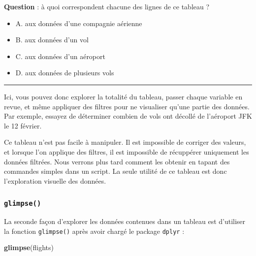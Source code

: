 \documentclass[
  a4paper,
]{article}
\newenvironment{Shaded}{\begin{snugshade}}{\end{snugshade}}
\newcommand{\KeywordTok}[1]{\textcolor[rgb]{0.12,0.11,0.11}{\textbf{#1}}}
\newcommand{\NormalTok}[1]{\textcolor[rgb]{0.12,0.11,0.11}{#1}}
\providecommand{\tightlist}{%
  \setlength{\itemsep}{0pt}\setlength{\parskip}{0pt}}
\begin{document}
\textbf{Question } : à quoi correspondent chacune des lignes de ce tableau ?

\begin{itemize}
\tightlist
\item
  A. aux données d'une compagnie aérienne
\item
  B. aux données d'un vol
\item
  C. aux données d'un aéroport
\item
  D. aux données de plusieurs vols
\end{itemize}

\begin{center}\rule{0.5\linewidth}{0.5pt}\end{center}

Ici, vous pouvez donc explorer la totalité du tableau, passer chaque variable en revue, et même appliquer des filtres pour ne visualiser qu'une partie des données. Par exemple, essayez de déterminer combien de vols ont décollé de l'aéroport JFK le 12 février.

Ce tableau n'est pas facile à manipuler. Il est impossible de corriger des valeurs, et lorsque l'on applique des filtres, il est impossible de récuppérer uniquement les données filtrées. Nous verrons plus tard comment les obtenir en tapant des commandes simples dans un script. La seule utilité de ce tableau est donc l'exploration visuelle des données.

\hypertarget{glimpse}{%
\subsubsection{\texorpdfstring{\texttt{glimpse()}}{glimpse()}}\label{glimpse}}

La seconde façon d'explorer les données contenues dans un tableau est d'utiliser la fonction \texttt{glimpse()} après avoir chargé le package \texttt{dplyr} :

\begin{Shaded}
\begin{Highlighting}[]
\KeywordTok{glimpse}\NormalTok{(flights)}
\end{Highlighting}
\end{Shaded}
\end{document}
